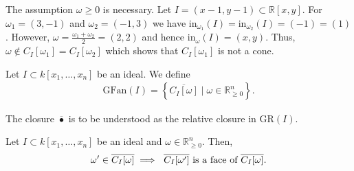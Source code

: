 \documentclass[a4paper, 11pt]{article}
\begin{document}
\begin{eg}
  The assumption \( \omega \geq 0 \) is necessary. Let \( I = (x-1, y-1) \subset \mathbb R[x,y] \).  For \( \omega_1 = (3, -1) \) and \( \omega_2 = (-1, 3) \) we have \( \mathrm{in}_{\omega_1}(I) = \mathrm{in}_{\omega_2}(I) = (-1) = (1) \). However, \( \omega = \frac{\omega_1 + \omega_2}{2} = (2,2) \) and hence \( \mathrm{in}_{\omega}(I) = (x,y) \). Thus, \( \omega \notin C_I[\omega_1] = C_I[\omega_2] \) which shows that \( C_I[\omega_1] \) is not a cone.


\begin{figure}[H]
  \centering
\end{figure}
\end{eg}

\begin{defi}
  Let \( I \subset k[x_1, \dots, x_n] \) be an ideal. We define 
  \begin{align*}
    \mathrm{GFan}(I) = \left\{ \overline{C_I[\omega]} \; | \; \omega \in \mathbb R^n_{\geq 0} \right\}.
  \end{align*}
\end{defi}

\begin{remark}
  The closure \( \overline{\bullet} \) is to be understood as the relative closure in \( \mathrm{GR}(I) \).
\end{remark}


\begin{lemma}
  Let \( I \subset k[x_1, \dots, x_n] \) be an ideal and \( \omega \in \mathbb R^n_{\geq 0} \). Then, 
  \begin{align*}
    \omega' \in \overline{C_I[\omega]} \implies \text{ \( \overline{C_I[\omega']} \) is a face of \( \overline{C_I[\omega]} \)}.
  \end{align*}
\end{lemma}
\end{document}
